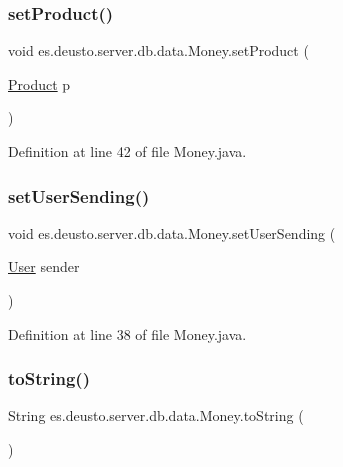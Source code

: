 \subsubsection{\texorpdfstring{set\+Product()}{setProduct()}}
{\footnotesize\ttfamily void es.\+deusto.\+server.\+db.\+data.\+Money.\+set\+Product (\begin{DoxyParamCaption}\item[{\hyperlink{classes_1_1deusto_1_1server_1_1db_1_1data_1_1_product}{Product}}]{p }\end{DoxyParamCaption})}



Definition at line 42 of file Money.\+java.

\mbox{\label{classes_1_1deusto_1_1server_1_1db_1_1data_1_1_money_ad5e5b686cbe1ce6e631915f40ef70892}} 
\subsubsection{\texorpdfstring{set\+User\+Sending()}{setUserSending()}}
{\footnotesize\ttfamily void es.\+deusto.\+server.\+db.\+data.\+Money.\+set\+User\+Sending (\begin{DoxyParamCaption}\item[{\hyperlink{classes_1_1deusto_1_1server_1_1db_1_1data_1_1_user}{User}}]{sender }\end{DoxyParamCaption})}



Definition at line 38 of file Money.\+java.

\mbox{\label{classes_1_1deusto_1_1server_1_1db_1_1data_1_1_money_a97d3500731b427992e9e40dcc0f0442d}} 
\subsubsection{\texorpdfstring{to\+String()}{toString()}}
{\footnotesize\ttfamily String es.\+deusto.\+server.\+db.\+data.\+Money.\+to\+String (\begin{DoxyParamCaption}{ }\end{DoxyParamCaption})}



